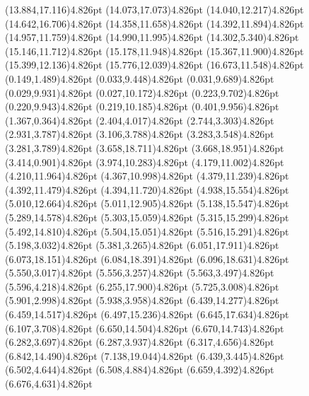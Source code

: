 \documentclass[10pt]{article}
\begin{document}
{{\qdisk(13.884,17.116){4.826pt}%
\qdisk(14.073,17.073){4.826pt}%
\qdisk(14.040,12.217){4.826pt}%
\qdisk(14.642,16.706){4.826pt}%
\qdisk(14.358,11.658){4.826pt}%
\qdisk(14.392,11.894){4.826pt}%
\qdisk(14.957,11.759){4.826pt}%
\qdisk(14.990,11.995){4.826pt}%
\qdisk(14.302,5.340){4.826pt}%
\qdisk(15.146,11.712){4.826pt}%
\qdisk(15.178,11.948){4.826pt}%
\qdisk(15.367,11.900){4.826pt}%
\qdisk(15.399,12.136){4.826pt}%
\qdisk(15.776,12.039){4.826pt}%
\qdisk(16.673,11.548){4.826pt}%
\dummycolor
\qdisk(0.149,1.489){4.826pt}%
\qdisk(0.033,9.448){4.826pt}%
\qdisk(0.031,9.689){4.826pt}%
\qdisk(0.029,9.931){4.826pt}%
\qdisk(0.027,10.172){4.826pt}%
\qdisk(0.223,9.702){4.826pt}%
\qdisk(0.220,9.943){4.826pt}%
\qdisk(0.219,10.185){4.826pt}%
\qdisk(0.401,9.956){4.826pt}%
\qdisk(1.367,0.364){4.826pt}%
\qdisk(2.404,4.017){4.826pt}%
\qdisk(2.744,3.303){4.826pt}%
\qdisk(2.931,3.787){4.826pt}%
\qdisk(3.106,3.788){4.826pt}%
\qdisk(3.283,3.548){4.826pt}%
\qdisk(3.281,3.789){4.826pt}%
\qdisk(3.658,18.711){4.826pt}%
\qdisk(3.668,18.951){4.826pt}%
\qdisk(3.414,0.901){4.826pt}%
\qdisk(3.974,10.283){4.826pt}%
\qdisk(4.179,11.002){4.826pt}%
\qdisk(4.210,11.964){4.826pt}%
\qdisk(4.367,10.998){4.826pt}%
\qdisk(4.379,11.239){4.826pt}%
\qdisk(4.392,11.479){4.826pt}%
\qdisk(4.394,11.720){4.826pt}%
\qdisk(4.938,15.554){4.826pt}%
\qdisk(5.010,12.664){4.826pt}%
\qdisk(5.011,12.905){4.826pt}%
\qdisk(5.138,15.547){4.826pt}%
\qdisk(5.289,14.578){4.826pt}%
\qdisk(5.303,15.059){4.826pt}%
\qdisk(5.315,15.299){4.826pt}%
\qdisk(5.492,14.810){4.826pt}%
\qdisk(5.504,15.051){4.826pt}%
\qdisk(5.516,15.291){4.826pt}%
\qdisk(5.198,3.032){4.826pt}%
\qdisk(5.381,3.265){4.826pt}%
\qdisk(6.051,17.911){4.826pt}%
\qdisk(6.073,18.151){4.826pt}%
\qdisk(6.084,18.391){4.826pt}%
\qdisk(6.096,18.631){4.826pt}%
\qdisk(5.550,3.017){4.826pt}%
\qdisk(5.556,3.257){4.826pt}%
\qdisk(5.563,3.497){4.826pt}%
\qdisk(5.596,4.218){4.826pt}%
\qdisk(6.255,17.900){4.826pt}%
\qdisk(5.725,3.008){4.826pt}%
\qdisk(5.901,2.998){4.826pt}%
\qdisk(5.938,3.958){4.826pt}%
\qdisk(6.439,14.277){4.826pt}%
\qdisk(6.459,14.517){4.826pt}%
\qdisk(6.497,15.236){4.826pt}%
\qdisk(6.645,17.634){4.826pt}%
\qdisk(6.107,3.708){4.826pt}%
\qdisk(6.650,14.504){4.826pt}%
\qdisk(6.670,14.743){4.826pt}%
\qdisk(6.282,3.697){4.826pt}%
\qdisk(6.287,3.937){4.826pt}%
\qdisk(6.317,4.656){4.826pt}%
\qdisk(6.842,14.490){4.826pt}%
\qdisk(7.138,19.044){4.826pt}%
\qdisk(6.439,3.445){4.826pt}%
\qdisk(6.502,4.644){4.826pt}%
\qdisk(6.508,4.884){4.826pt}%
\qdisk(6.659,4.392){4.826pt}%
\qdisk(6.676,4.631){4.826pt}%
}}
\end{document}
